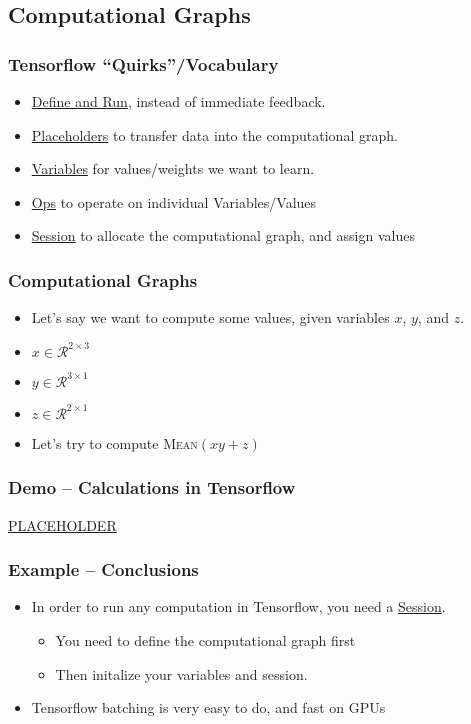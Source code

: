 \documentclass{beamer}
\begin{document}
\subsection{Computational Graphs}

\begin{frame}
  \frametitle{Tensorflow ``Quirks''/Vocabulary}
  \begin{itemize}
  \item \underline{Define and Run}, instead of immediate feedback.
  \item \underline{Placeholders} to transfer data into the computational graph.
  \item \underline{Variables} for values/weights we want to learn.
  \item \underline{Ops} to operate on individual Variables/Values
  \item \underline{Session} to allocate the computational graph, and assign values
  \end{itemize}
\end{frame}

\begin{frame}
  \frametitle{Computational Graphs}
  \begin{itemize}
  \item Let's say we want to compute some values, given variables $x$, $y$, and $z$.
  \item $x \in \mathcal{R}^{2 \times 3}$
  \item $y \in \mathcal{R}^{3 \times 1}$
  \item $z \in \mathcal{R}^{2 \times 1}$
  \item Let's try to compute \textsc{Mean}$(xy + z)$
  \end{itemize}
\end{frame}


\begin{frame}
  \frametitle{Demo -- Calculations in Tensorflow}
  \Huge{\centerline{\href{PLACEHOLDER}{PLACEHOLDER}}}
\end{frame}

\begin{frame}
  \frametitle{Example -- Conclusions}
  \begin{itemize}
  \item In order to run any computation in Tensorflow, you need a \underline{Session}.
    \begin{itemize}
    \item You need to define the computational graph first
    \item Then initalize your variables and session.
    \end{itemize}
  \item Tensorflow batching is very easy to do, and fast on GPUs
  \end{itemize}
\end{frame}
\end{document}
